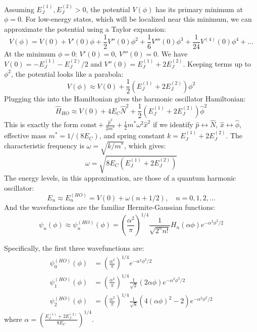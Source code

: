 \documentclass{book}
\begin{document}
Assuming \(E_J^{(1)}, E_J^{(2)} > 0\), the potential \(V(\phi)\) has its primary minimum at \(\phi = 0\). For low-energy states, which will be localized near this minimum, we can approximate the potential using a Taylor expansion:
\[ V(\phi) = V(0) + V'(0)\phi + \frac{1}{2}V''(0)\phi^2 + \frac{1}{6}V'''(0)\phi^3 + \frac{1}{24}V^{(4)}(0)\phi^4 + \dots \]
At the minimum \(\phi=0\): \(V'(0)=0\), \(V'''(0)=0\). We have \(V(0) = -E_J^{(1)} - E_J^{(2)}/2\) and \(V''(0) = E_J^{(1)} + 2 E_J^{(2)}\). Keeping terms up to \(\phi^2\), the potential looks like a parabola:
\[ V(\phi) \approx V(0) + \frac{1}{2} (E_J^{(1)} + 2 E_J^{(2)}) \phi^2 \]
Plugging this into the Hamiltonian gives the harmonic oscillator Hamiltonian:
\begin{equation}
\hat{H}_{HO} \approx V(0) + 4 E_C \hat{N}^2 + \frac{1}{2} (E_J^{(1)} + 2 E_J^{(2)}) \hat{\phi}^2
\end{equation}
This is exactly the form \(\text{const} + \frac{\hat{p}^2}{2m^*} + \frac{1}{2} m^* \omega^2 \hat{x}^2\) if we identify \(\hat{p} \leftrightarrow \hat{N}\), \(\hat{x} \leftrightarrow \hat{\phi}\), effective mass \(m^* = 1/(8 E_C)\), and spring constant \(k = E_J^{(1)} + 2 E_J^{(2)}\). The characteristic frequency is \(\omega = \sqrt{k/m^*}\), which gives:
\begin{equation}
\omega = \sqrt{8 E_C (E_J^{(1)} + 2 E_J^{(2)})}
\label{eq:ho_freq}
\end{equation}
The energy levels, in this approximation, are those of a quantum harmonic oscillator:
\begin{equation}
E_n \approx E_n^{(HO)} = V(0) + \omega (n + 1/2), \quad n = 0, 1, 2, \dots
\label{eq:ho_energies}
\end{equation}
And the wavefunctions are the familiar Hermite-Gaussian functions:
\begin{equation}
\psi_n(\phi) \approx \psi_n^{(HO)}(\phi) = \left( \frac{\alpha^2}{\pi} \right)^{1/4} \frac{1}{\sqrt{2^n n!}} H_n(\alpha \phi) e^{-\alpha^2 \phi^2 / 2}
\label{eq:ho_wavefn}
\end{equation}


Specifically, the first three wavefunctions are:
\begin{align*}
\psi_0^{(HO)}(\phi) &= \left( \frac{\alpha^2}{\pi} \right)^{1/4} e^{-\alpha^2 \phi^2 / 2} \\
\psi_1^{(HO)}(\phi) &= \left( \frac{\alpha^2}{\pi} \right)^{1/4} \frac{1}{\sqrt{2}} (2\alpha\phi) e^{-\alpha^2 \phi^2 / 2} \\
\psi_2^{(HO)}(\phi) &= \left( \frac{\alpha^2}{\pi} \right)^{1/4} \frac{1}{\sqrt{8}} (4(\alpha\phi)^2 - 2) e^{-\alpha^2 \phi^2 / 2} 
\end{align*}
where $\alpha = \left( \frac{E_J^{(1)} + 2 E_J^{(2)}}{8 E_C} \right)^{1/4}$.
\end{document}
